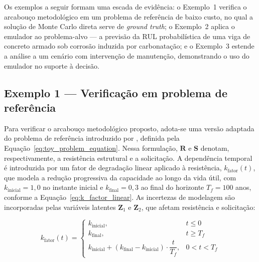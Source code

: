 
Os exemplos a seguir formam uma escada de evidência: o Exemplo~1 verifica o arcabouço metodológico em um problema de referência de baixo custo, no qual a solução de Monte Carlo direta serve de \textit{ground truth}; o Exemplo~2 aplica o emulador ao problema-alvo --- a previsão da RUL probabilística de uma viga de concreto armado sob corrosão induzida por carbonatação; e o Exemplo~3 estende a análise a um cenário com intervenção de manutenção, demonstrando o uso do emulador no suporte à decisão.

\subsection{Exemplo 1 --- Verificação em problema de referência}
\label{subsec:exemplo1}

Para verificar o arcabouço metodológico proposto, adota-se uma versão adaptada do problema de referência introduzido por \citet{pires2024}, definida pela Equação~\eqref{eq:toy_problem_equation}. Nessa formulação, $\mathbf{R}$ e $\mathbf{S}$ denotam, respectivamente, a resistência estrutural e a solicitação. A dependência temporal é introduzida por um fator de degradação linear aplicado à resistência, $k_{\mathrm{fator}}(t)$, que modela a redução progressiva da capacidade ao longo da vida útil, com $k_{\mathrm{inicial}} = 1{,}0$ no instante inicial e $k_{\mathrm{final}} = 0{,}3$ ao final do horizonte $T_f = 100$ anos, conforme a Equação~\eqref{eq:k_factor_linear}. As incertezas de modelagem são incorporadas pelas variáveis latentes $\mathbf{Z}_1$ e $\mathbf{Z}_2$, que afetam resistência e solicitação:

\begin{equation}
k_{\mathrm{fator}}(t) =
\begin{cases}
k_{\mathrm{inicial}}, & t \leq 0 \\[5pt]
k_{\mathrm{final}}, & t \geq T_f \\[5pt]
k_{\mathrm{inicial}} + (k_{\mathrm{final}} - k_{\mathrm{inicial}}) \cdot \dfrac{t}{T_f}, & 0 < t < T_f
\end{cases}
\label{eq:k_factor_linear}
\end{equation}


